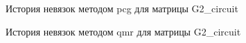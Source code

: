 \begin{figure}[H]
    \renewcommand{\figurename}{Рисунок}
    \caption{История невязок методом pcg для матрицы G2\_circuit}
    \label{fig:image_50}
\end{figure}

\begin{figure}[H]
    \renewcommand{\figurename}{Рисунок}
    \caption{История невязок методом qmr для матрицы G2\_circuit}
    \label{fig:image_51}
\end{figure}


